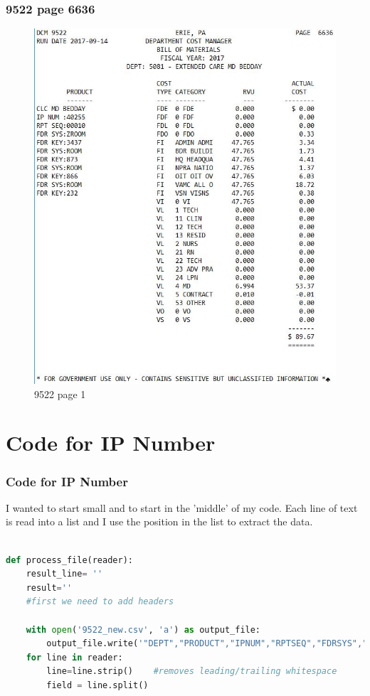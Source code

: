 \documentclass{beamer}\usepackage[]{graphicx}\usepackage[]{color}
\begin{document}
\begin{frame}[fragile]
  \frametitle{9522 page 6636}
  
\begin{figure}
\includegraphics[scale=0.4]{9522_page6636}
\caption{9522 page 1}
\end{figure}
  
\end{frame}


\section{Code for IP Number}
\begin{frame}[fragile]
  \frametitle{Code for IP Number}
I wanted to start small and to start in the 'middle' of my code. Each line of text is read into a list and I use the position in the list to extract the data.
\begin{lstlisting}[language=Python]

def process_file(reader):
    result_line= ''
    result=''
    #first we need to add headers
    
    with open('9522_new.csv', 'a') as output_file:
        output_file.write('"DEPT","PRODUCT","IPNUM","RPTSEQ","FDRSYS","FDRKEY"' +'\n')
    for line in reader:
        line=line.strip()    #removes leading/trailing whitespace
        field = line.split()
\end{lstlisting}
        

   
\end{frame}
\end{document}
